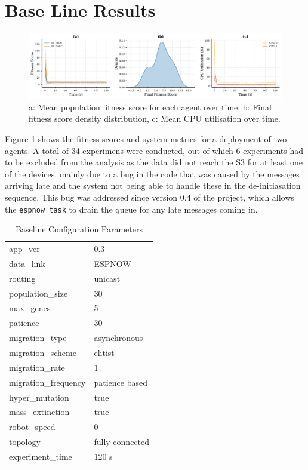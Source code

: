 \documentclass[conference]{IEEEtran}
\begin{document}
\newpage
\section{Base Line Results}

\begin{figure}[t]
  \centering
  \includegraphics[width=1\textwidth]{base_fitness_stats.pdf}
  \caption{a: Mean population fitness score for each agent over time,  b: Final fitness score density distribution, c: Mean CPU utilisation over time.}
  \label{fig:base_fitness_stats}
\end{figure}

Figure \ref{fig:base_fitness_stats} shows the fitness scores and system metrics for a deployment of two agents. A total of 34 experimens were conducted, out of which 6 experiments had to be excluded from the analysis as the data did not reach the S3 for at least one of the devices, mainly due to a bug in the code that was caused by the messages arriving late and the system not being able to handle these in the de-initiasation sequence. This bug was addressed since version 0.4 of the project, which allows the \texttt{espnow\_task} to drain the queue for any late messages coming in.\\

\begin{table}[h]
  \centering
  \caption{Baseline Configuration Parameters}
  \label{tab:base_config}
  \begin{tabular}{l@{~=~}l}
    app\_ver & 0.3\\
    data\_link & ESPNOW\\
    routing & unicast\\
    population\_size & 30\\
    max\_genes & 5\\
    patience & 30\\
    migration\_type & asynchronous\\
    migration\_scheme & elitist\\
    migration\_rate & 1\\
    migration\_frequency & patience based\\
    hyper\_mutation & true\\
    mass\_extinction & true\\
    robot\_speed & 0\\
    topology & fully connected\\
    experiment\_time & 120 s\\
  \end{tabular}
\end{table}
\end{document}
